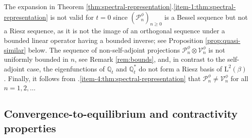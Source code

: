 \documentclass[JEP,XML,SOM,Unicode]{cedram}
\theoremstyle{plain}
\theoremstyle{definition}
\renewcommand{\P}{\mathcal{P}}
\newcommand{\V}{\mathcal{V}}
\newcommand{\J}{\mathds{Q}}
\newcommand{\Leb}{\mathrm{L}}
\let\bpsi\beta
\begin{document}
The expansion in Theorem \ref{thm:spectral-representation}.\eqref{item-1:thm:spectral-representation} is not valid for $t =0$ since $(\P_n^\phi)_{n \geq 0}$ is a Bessel sequence but not a Riesz sequence, as it is not the image of an orthogonal sequence under a bounded linear operator having a bounded inverse; see Proposition \ref{prop:quasi-similar} below. The sequence of non-self-adjoint projections $\P_n^\phi \otimes \V_n^\phi$ is not uniformly bounded in $n$, see Remark \ref{rem:bounds}, and, in contrast to the self-adjoint case, the eigenfunctions of $\J_t$ and $\J_t^*$ do not form a Riesz basis of $\Leb^2(\bpsi)$. Finally, it follows from .\eqref{item-4:thm:spectral-representation} that $\P_n^\phi \neq \V_n^\phi$ for all $n = 1,2,\ldots$

\subsection{Convergence-to-equilibrium and contractivity properties}
\end{document}
